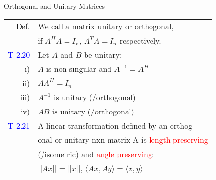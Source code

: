 \begin{mainbox}{Orthogonal and Unitary Matrices}
\setlength{\tabcolsep}{2pt}
\begin{tabular}{rl}
	Def. & We call a matrix unitary or orthogonal, \\
	& if $A^HA = I_n$, $A^TA = I_n$ respectively.\\
	\rule{0pt}{3ex}
	\textcolor{blue}{T 2.20} & Let $A$ and $B$ be unitary:\\
	i) & $A$ is non-singular and $A^{-1} = A^H$\\
	ii) & $AA^H = I_n$\\
	iii) & $A^{-1}$ is unitary (/orthogonal)\\
	iv) & $AB$ is unitary (/orthogonal)\\
	\rule{0pt}{3ex}
	\textcolor{blue}{T 2.21} & A linear transformation defined by an orthog-\\
	& onal or unitary nxn matrix A is \textcolor{red}{length preserving} \\
	& (/isometric) and \textcolor{red}{angle preserving}:\\
	& $||Ax|| = ||x||$, $\langle Ax,Ay\rangle = \langle x,y\rangle$\\
\end{tabular}
\end{mainbox}

